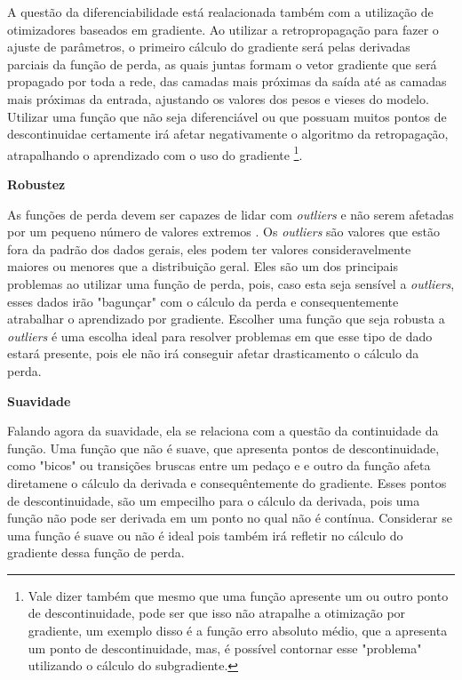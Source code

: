 A questão da diferenciabilidade está realacionada também com a utilização de otimizadores baseados em gradiente. Ao utilizar a retropropagação para fazer o ajuste de parâmetros, o primeiro cálculo do gradiente será pelas derivadas parciais da função de perda, as quais juntas formam o vetor gradiente que será propagado por toda a rede, das camadas mais próximas da saída até as camadas mais próximas da entrada, ajustando os valores dos pesos e vieses do modelo. Utilizar uma função que não seja diferenciável ou que possuam muitos pontos de descontinuidae certamente irá afetar negativamente o algoritmo da retropagação, atrapalhando o aprendizado com o uso do gradiente \footnote{Vale dizer também que mesmo que uma função apresente um ou outro ponto de descontinuidade, pode ser que isso não atrapalhe a otimização por gradiente, um exemplo disso é a função erro absoluto médio, que a apresenta um ponto de descontinuidade, mas, é possível contornar esse "problema" utilizando o cálculo do subgradiente.}.

\medskip
\textbf{Robustez}
\medskip

As funções de perda devem ser capazes de lidar com \textit{outliers} e não serem afetadas por um pequeno número de valores extremos \parencite{LossesArticle}. Os \textit{outliers} são valores que estão fora da padrão dos dados gerais, eles podem ter valores consideravelmente maiores ou menores que a distribuição geral. Eles são um dos principais problemas ao utilizar uma função de perda, pois, caso esta seja sensível a \textit{outliers}, esses dados irão "bagunçar" com o cálculo da perda e consequentemente atrabalhar o aprendizado por gradiente. Escolher uma função que seja robusta a \textit{outliers} é uma escolha ideal para resolver problemas em que esse tipo de dado estará presente, pois ele não irá conseguir afetar drasticamento o cálculo da perda.


\medskip
\textbf{Suavidade}
\medskip

Falando agora da suavidade, ela se relaciona com a questão da continuidade da função. Uma função que não é suave, que apresenta pontos de descontinuidade, como "bicos" ou transições bruscas entre um pedaço e e outro da função afeta diretamene o cálculo da derivada e consequêntemente do gradiente. Esses pontos de descontinuidade, são um empecilho para o cálculo da derivada, pois uma função não pode ser derivada em um ponto no qual não é contínua. Considerar se uma função é suave ou não é ideal pois também irá refletir no cálculo do gradiente dessa função de perda.

